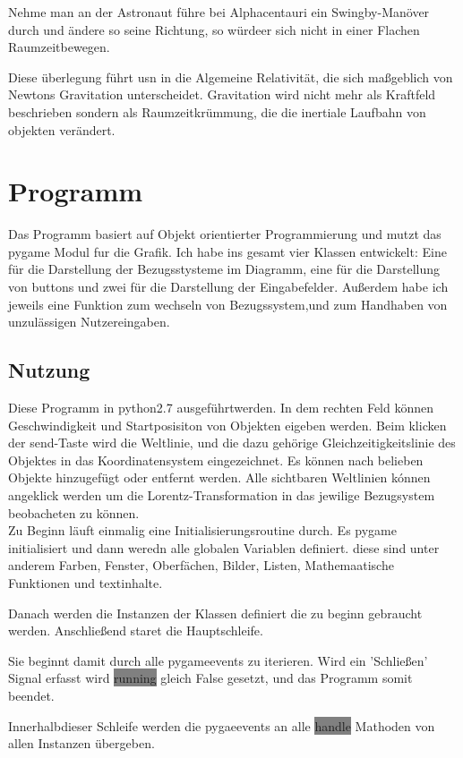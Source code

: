 \documentclass[12pt]{article}
\begin{document}
Nehme man an der Astronaut führe bei Alphacentauri ein Swingby-Manöver durch und ändere so seine Richtung, so würdeer sich nicht in einer Flachen Raumzeitbewegen.

Diese überlegung führt usn in die Algemeine Relativität, die sich maßgeblich von Newtons Gravitation unterscheidet.
Gravitation wird nicht mehr als Kraftfeld beschrieben sondern als Raumzeitkrümmung, die die inertiale Laufbahn von objekten verändert.

\section{Programm}
Das Programm basiert auf Objekt orientierter Programmierung und mutzt das pygame Modul fur die Grafik.
Ich habe ins gesamt vier Klassen entwickelt:
Eine für die Darstellung der Bezugsstysteme im Diagramm, eine für die Darstellung von buttons und zwei für die Darstellung der Eingabefelder.
Außerdem habe ich jeweils eine Funktion zum wechseln von Bezugssystem,und zum Handhaben von unzulässigen Nutzereingaben.
\subsection{Nutzung}
Diese Programm in python2.7 ausgeführtwerden.
In dem rechten Feld können Geschwindigkeit und Startposisiton von Objekten eigeben werden.
Beim klicken der send-Taste wird die Weltlinie, und die dazu gehörige Gleichzeitigkeitslinie des Objektes in das Koordinatensystem eingezeichnet.
Es können nach belieben Objekte hinzugefügt oder entfernt werden.
Alle sichtbaren Weltlinien kónnen angeklick werden um die Lorentz-Transformation in das jewilige Bezugsystem beobacheten zu können.
\\

Zu Beginn läuft einmalig eine Initialisierungsroutine durch.
Es pygame initialisiert und dann weredn alle globalen Variablen definiert.
diese sind unter anderem Farben, Fenster, Oberfächen, Bilder, Listen, Mathemaatische Funktionen und textinhalte.

Danach werden die Instanzen der Klassen definiert die zu beginn gebraucht werden.
Anschließend staret die Hauptschleife.

Sie beginnt damit durch alle pygameevents zu iterieren.
Wird ein 'Schließen' Signal erfasst wird \colorbox{gray}{running} gleich False gesetzt, und das Programm somit beendet.

Innerhalbdieser Schleife werden die pygaeevents an alle \colorbox{gray}{handle} Mathoden von allen Instanzen übergeben.
\end{document}
